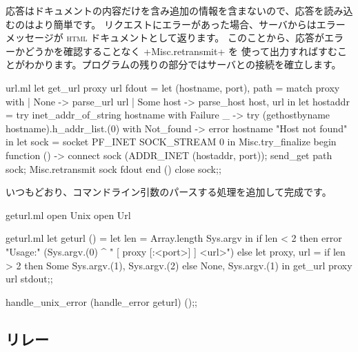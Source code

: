 応答はドキュメントの内容だけを含み追加の情報を含まないので、応答を読み込むのはより簡単です。
リクエストにエラーがあった場合、サーバからはエラーメッセージが
\textsc{html} ドキュメントとして返ります。
このことから、応答がエラーかどうかを確認することなく \ml+Misc.retransmit+ を
使って出力すればすむことがわかります。プログラムの残りの部分ではサーバとの接続を確立します。
%
\begin{listingcodefile}{url.ml}
let get_url proxy url fdout =
  let (hostname, port), path = match proxy with
    | None -> parse_url url
    | Some host -> parse_host host, url
  in
  let hostaddr =
    try inet_addr_of_string hostname
    with Failure _ ->
      try (gethostbyname hostname).h_addr_list.(0)
      with Not_found -> error hostname "Host not found"
  in
  let sock = socket PF_INET SOCK_STREAM 0 in
  Misc.try_finalize
    begin function () ->
      connect sock (ADDR_INET (hostaddr, port));
      send_get path sock;
      Misc.retransmit sock fdout
    end ()
    close sock;;
\end{listingcodefile}
%
いつもどおり、コマンドライン引数のパースする処理を追加して完成です。
%
\begin{codefile}{geturl.ml}
open Unix
open Url
\end{codefile}
%
\begin{listingcodefile}{geturl.ml}
let geturl () =
  let len =  Array.length Sys.argv in
  if len < 2 then
    error "Usage:" (Sys.argv.(0) ^ " [ proxy [:<port>] ] <url>")
  else
    let proxy, url =
      if len > 2 then Some Sys.argv.(1), Sys.argv.(2) else
      None, Sys.argv.(1)
    in
    get_url proxy url stdout;;

handle_unix_error (handle_error geturl) ();;
\end{listingcodefile}

\subsection*{\label{sec/relay}{\normalfont\http} リレー}


